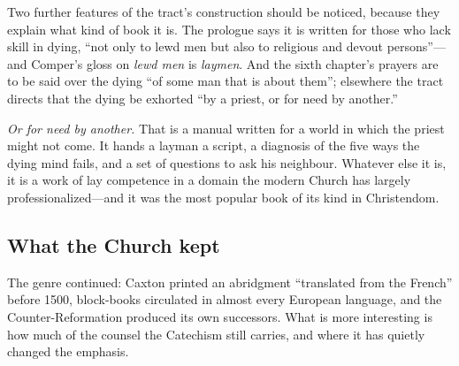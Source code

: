 Two further features of the tract's construction should be noticed, because they explain what kind of book it is. The prologue says it is written for those who lack skill in dying, ``not only to lewd men but also to religious and devout persons''---and Comper's gloss on \emph{lewd men} is \emph{laymen}. And the sixth chapter's prayers are to be said over the dying ``of some man that is about them''; elsewhere the tract directs that the dying be exhorted ``by a priest, or for need by another.''

\emph{Or for need by another.} That is a manual written for a world in which the priest might not come. It hands a layman a script, a diagnosis of the five ways the dying mind fails, and a set of questions to ask his neighbour. Whatever else it is, it is a work of lay competence in a domain the modern Church has largely professionalized---and it was the most popular book of its kind in Christendom.

\subsection{What the Church kept}

The genre continued: Caxton printed an abridgment ``translated from the French'' before 1500, block-books circulated in almost every European language, and the Counter-Reformation produced its own successors. What is more interesting is how much of the counsel the Catechism still carries, and where it has quietly changed the emphasis.

